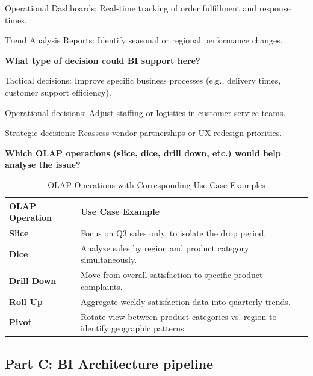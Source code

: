 Operational Dashboards: Real-time tracking of order fulfillment and response times.

Trend Analysis Reports: Identify seasonal or regional performance changes.

\bigskip

\noindent\textbf{What type of decision could BI support here?}

Tactical decisions: Improve specific business processes (e.g., delivery times, customer support efficiency).

Operational decisions: Adjust staffing or logistics in customer service teams.

Strategic decisions: Reassess vendor partnerships or UX redesign priorities.

\bigskip

\noindent\textbf{Which OLAP operations (slice, dice, drill down, etc.) would help analyse the issue?}

\begin{table}[htbp]
\centering
\renewcommand{\arraystretch}{1.35}
\begin{tabular}{|p{3.5cm}|p{11cm}|}
\hline
\textbf{OLAP Operation} & \textbf{Use Case Example} \\
\hline

\textbf{Slice} &
Focus on Q3 sales only, to isolate the drop period. \\
\hline

\textbf{Dice} &
Analyze sales by region and product category simultaneously. \\
\hline

\textbf{Drill Down} &
Move from overall satisfaction to specific product complaints. \\
\hline

\textbf{Roll Up} &
Aggregate weekly satisfaction data into quarterly trends. \\
\hline

\textbf{Pivot} &
Rotate view between product categories vs. region to identify geographic patterns. \\
\hline

\end{tabular}
\caption{OLAP Operations with Corresponding Use Case Examples}
\end{table}


\subsection{Part C: BI Architecture pipeline}

